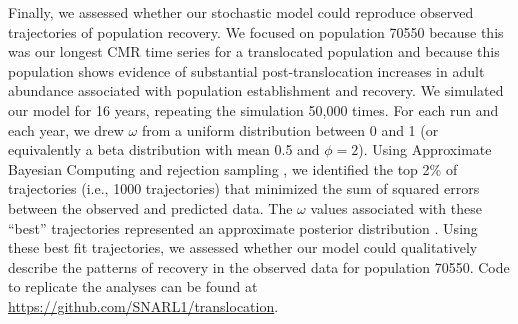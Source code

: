 \documentclass[9pt,twoside,lineno]{pnas-new}
\begin{document}
Finally, we assessed whether our stochastic model could reproduce
observed trajectories of population recovery. We focused on population
70550 because this was our longest CMR time series for a translocated
population and because this population shows evidence of substantial
post-translocation increases in adult abundance associated with
population establishment and recovery. We simulated our model for 16
years, repeating the simulation 50,000 times. For each run and each
year, we drew \(\omega\) from a uniform distribution between 0 and 1 (or
equivalently a beta distribution with mean 0.5 and \(\phi = 2\)). Using
Approximate Bayesian Computing and rejection sampling
\citep{kosmala2016}, we identified the top 2\% of trajectories (i.e.,
1000 trajectories) that minimized the sum of squared errors between the
observed and predicted data. The \(\omega\) values associated with these
``best'' trajectories represented an approximate posterior distribution
\citep{beaumont2010}. Using these best fit trajectories, we assessed
whether our model could qualitatively describe the patterns of recovery
in the observed data for population 70550. Code to replicate the
analyses can be found at \url{https://github.com/SNARL1/translocation}.

\newpage
\end{document}
